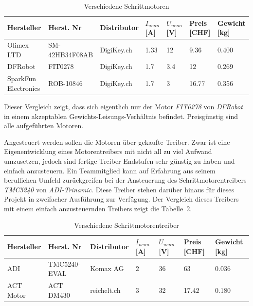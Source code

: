 \documentclass[main.tex]{subfiles} %
\begin{document}
\begin{table}[h]
    \centering
    \begin{tabular}{|p{2cm}|p{3cm}|p{2cm}|p{1cm}|p{1cm}|p{1cm}|p{1.5cm}|}
        \hline
        Hersteller           & Herst. Nr      & Distributor & $I_{nenn} $ [A] & $U_{nenn}$ [V] & Preis [CHF] & Gewicht [kg] \\ \hline
        Olimex LTD           & SM-42HB34F08AB & DigiKey.ch  & 1.33            & 12             & 9.36        & 0.400        \\ \hline
        DFRobot              & FIT0278        & DigiKey.ch  & 1.7             & 3.4            & 12          & 0.269        \\ \hline
        SparkFun Electronics & ROB-10846      & DigiKey.ch  & 1.7             & 3              & 16.77       & 0.356        \\ \hline
    \end{tabular}
    \caption{Verschiedene Schrittmotoren}
    \label{tab:Schrittmotoren_different}
\end{table}

Dieser Vergleich zeigt, dass sich eigentlich nur der Motor \textit{FIT0278} von
\textit{DFRobot} in einem akzeptablen Gewichts-Leisungs-Verhältnis befindet.
Preisgünstig sind alle aufgeführten Motoren.

Angesteuert werden sollen die Motoren über gekaufte Treiber. Zwar ist eine
Eigenentwicklung eines Motorentreibers mit nicht all zu viel Aufwand
umzusetzen, jedoch sind fertige Treiber-Endstufen sehr günstig zu haben und
einfach anzusteuern. Ein Teammitglied kann auf Erfahrung aus seinem beruflichen
Umfeld zurückgreifen bei der Ansteuerung des Schrittmotorentreibers
\textit{TMC5240} von \textit{ADI-Trinamic}. Diese Treiber stehen darüber hinaus
für dieses Projekt in zweifacher Ausführung zur Verfügung. Der Vergleich dieses
Treibers mit einem einfach anzusteuernden Treibers zeigt die
Tabelle~\ref{tab:Schrittmotorentreiber_different}.

\begin{table}[h]
    \centering
    \begin{tabular}{|p{2cm}|p{3cm}|p{2cm}|p{1cm}|p{1cm}|p{1cm}|p{1.5cm}|}
        \hline
        Hersteller & Herst. Nr    & Distributor & $I_{nenn} $ [A] & $U_{nenn}$ [V] & Preis [CHF] & Gewicht [kg] \\ \hline
        ADI        & TMC5240-EVAL & Komax AG    & 2               & 36             & 63          & 0.036        \\ \hline
        ACT Motor  & ACT DM430    & reichelt.ch & 3               & 32             & 17.42       & 0.180        \\ \hline
    \end{tabular}
    \caption{Verschiedene Schrittmotorentreiber}
    \label{tab:Schrittmotorentreiber_different}
\end{table}
\end{document}
